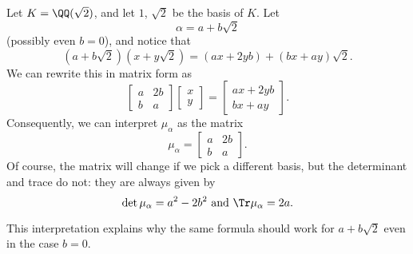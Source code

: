 \begin{example}
	Let $K = \QQ(\sqrt2)$, and let $1$, $\sqrt 2$ be the basis of $K$.
	Let \[ \alpha = a + b \sqrt 2 \] (possibly even $b = 0$), and notice that
	\[ \left( a+b\sqrt2 \right) \left(x+y\sqrt2 \right)
		= (ax+2yb) + (bx+ay)\sqrt2. \]
	We can rewrite this in matrix form as
	\[ 
		\begin{bmatrix}
			a & 2b \\
			b & a
		\end{bmatrix}
		\begin{bmatrix}
			x \\ y
		\end{bmatrix}
		=
		\begin{bmatrix}
			ax+2yb \\ bx+ay
		\end{bmatrix}.
	\]
	Consequently, we can interpret $\mu_\alpha$ as the matrix
	\[ \mu_\alpha = 
		\begin{bmatrix}
			a & 2b \\ b & a
		\end{bmatrix}. \]
	Of course, the matrix will change if we pick a different basis,
	but the determinant and trace do not: they are always given by
	\[ \det \mu_\alpha = a^2-2b^2 \text{ and }
		\Tr \mu_\alpha = 2a. \]
\end{example}
This interpretation explains why the same formula should work for $a+b\sqrt 2$
even in the case $b = 0$.

